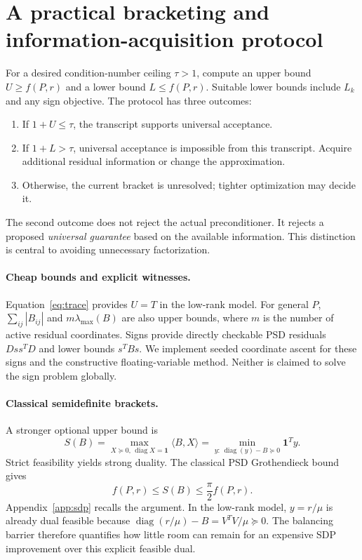\documentclass[11pt]{article}
\theoremstyle{definition}\newtheorem{definition}[theorem]{Definition}
\newcommand{\diag}{\operatorname{diag}}
\begin{document}
\section{A practical bracketing and information-acquisition protocol}
For a desired condition-number ceiling $\tau>1$, compute an upper bound $U\ge f(P,r)$ and a lower bound $L\le f(P,r)$. Suitable lower bounds include $L_k$ and any sign objective. The protocol has three outcomes:
\begin{enumerate}
\item If $1+U\le\tau$, the transcript supports universal acceptance.
\item If $1+L>\tau$, universal acceptance is impossible from this transcript. Acquire additional residual information or change the approximation.
\item Otherwise, the current bracket is unresolved; tighter optimization may decide it.
\end{enumerate}
The second outcome does not reject the actual preconditioner. It rejects a proposed \emph{universal guarantee} based on the available information. This distinction is central to avoiding unnecessary factorization.

\paragraph{Cheap bounds and explicit witnesses.}
Equation~\eqref{eq:trace} provides $U=T$ in the low-rank model. For general $P$, $\sum_{ij}|B_{ij}|$ and $m\lambda_{\max}(B)$ are also upper bounds, where $m$ is the number of active residual coordinates. Signs provide directly checkable PSD residuals $Ds s^TD$ and lower bounds $s^TBs$. We implement seeded coordinate ascent for these signs and the constructive floating-variable method. Neither is claimed to solve the sign problem globally.

\paragraph{Classical semidefinite brackets.}
A stronger optional upper bound is
\begin{equation}\label{eq:sdp}
 S(B)=\max_{X\succeq0,\,\diag X=\mathbf1}\langle B,X\rangle
 =\min_{y:\,\diag(y)-B\succeq0}\mathbf1^Ty.
\end{equation}
Strict feasibility yields strong duality. The classical PSD Grothendieck bound gives
\begin{equation}
 f(P,r)\le S(B)\le\frac{\pi}{2}f(P,r).
\end{equation}
Appendix~\ref{app:sdp} recalls the argument. In the low-rank model, $y=r/\mu$ is already dual feasible because $\diag(r/\mu)-B=V^TV/\mu\succeq0$. The balancing barrier therefore quantifies how little room can remain for an expensive SDP improvement over this explicit feasible dual.
\end{document}
